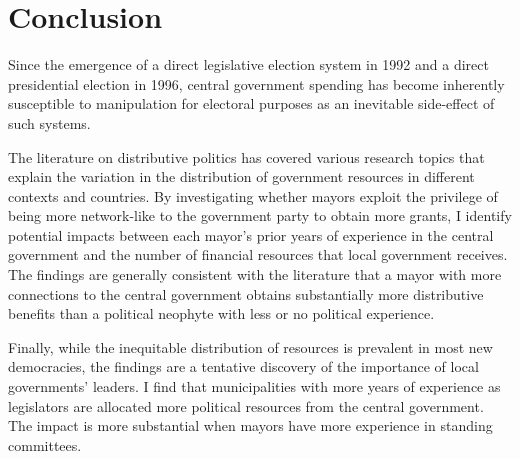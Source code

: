 \section*{\centering Conclusion}

Since the emergence of a direct legislative election system in 1992 and a direct presidential election in 1996, central government spending has become inherently susceptible to manipulation for electoral purposes as an inevitable side-effect of such systems. 

The literature on distributive politics has covered various research topics that explain the variation in the distribution of government resources in different contexts and countries. By investigating whether mayors exploit the privilege of being more network-like to the government party to obtain more grants, I identify potential impacts between each mayor's prior years of experience in the central government and the number of financial resources that local government receives. The findings are generally consistent with the literature \citep{Keefer2008,Keefer2009} that a mayor with more connections to the central government obtains substantially more distributive benefits than a political neophyte with less or no political experience.

Finally, while the inequitable distribution of resources is prevalent in most new democracies, the findings are a tentative discovery of the importance of local governments' leaders. I find that municipalities with more years of experience as legislators are allocated more political resources from the central government. The impact is more substantial when mayors have more experience in standing committees.